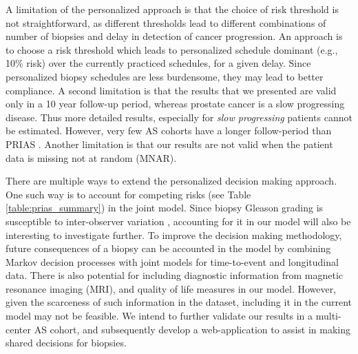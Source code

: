 A limitation of the personalized approach is that the choice of risk threshold is not straightforward, as different thresholds lead to different combinations of number of biopsies and delay in detection of cancer progression. An approach is to choose a risk threshold which leads to personalized schedule dominant (e.g., 10\% risk) over the currently practiced schedules, for a given delay. Since personalized biopsy schedules are less burdensome, they may lead to better compliance. A second limitation is that the results that we presented are valid only in a 10 year follow-up period, whereas prostate cancer is a slow progressing disease. Thus more detailed results, especially for \textit{slow progressing} patients cannot be estimated. However, very few AS cohorts have a longer follow-period than PRIAS \cite{bruinsma2016active}. Another limitation is that our results are not valid when the patient data is missing not at random (MNAR).

There are multiple ways to extend the personalized decision making approach. One such way is to account for competing risks (see Table \ref{table:prias_summary}) in the joint model. Since biopsy Gleason grading is susceptible to inter-observer variation \cite{coley2017}, accounting for it in our model will also be interesting to investigate further. To improve the decision making methodology, future consequences of a biopsy can be accounted in the model by combining Markov decision processes with joint models for time-to-event and longitudinal data. There is also potential for including diagnostic information from magnetic resonance imaging (MRI), and quality of life measures in our model. However, given the scarceness of such information in the dataset, including it in the current model may not be feasible. We intend to further validate our results in a multi-center AS cohort, and subsequently develop a web-application to assist in making shared decisions for biopsies.